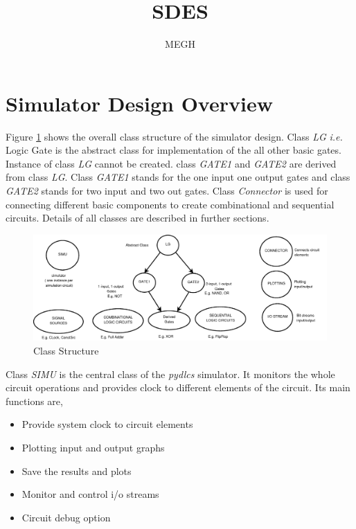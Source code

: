 \documentclass[a4paper,12pt]{article}
\title{SDES}
\author{MEGH}
\begin{document}

% 
% 

\section{Simulator Design Overview}

Figure \ref{class_struct}  shows the overall class structure of the simulator design. Class \emph{LG} \emph{i.e.} Logic Gate is the abstract class for implementation of the all other basic gates. Instance of class \emph{LG} cannot be created. class \emph{GATE1} and \emph{GATE2} are derived from class \emph{LG}. Class \emph{GATE1} stands for the one input one output gates and class \emph{GATE2} stands for two input and two out gates. Class \emph{Connector} is used for connecting different basic components to create combinational and sequential circuits. Details of all classes are described in further sections.


  \begin{figure}[!h]
   \begin{center}
   \includegraphics[scale=0.3]{class3.png}
    \caption{{Class Structure}}
  \label{class_struct}
  \end{center}
  \end{figure}

Class \emph{SIMU} is the central class of the \emph{pydlcs} simulator. It monitors the whole circuit operations and provides clock to different elements of the circuit. Its main functions are,
\begin{itemize}
 \item Provide system clock to circuit elements
 \item Plotting input and output graphs
 \item Save the results and plots
 \item Monitor and control i/o streams
 \item Circuit debug option
\end{itemize}
\end{document}
